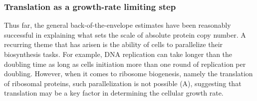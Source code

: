 \subsubsection{Translation as a growth-rate limiting step}
Thus far, the general back-of-the-envelope estimates have been
reasonably successful in explaining what sets the scale of absolute protein copy
number. A recurring theme that has arisen is the ability of cells to parallelize
their biosynthesis tasks. For example, DNA replication can take longer than the
doubling time as long as cells initiation more than one round of replication per
doubling. However, when it comes to ribosome biogenesis, namely the translation
of ribosomal proteins, such parallelization is not possible
(A), suggesting that translation may be a key factor in
determining the cellular growth rate.


%

